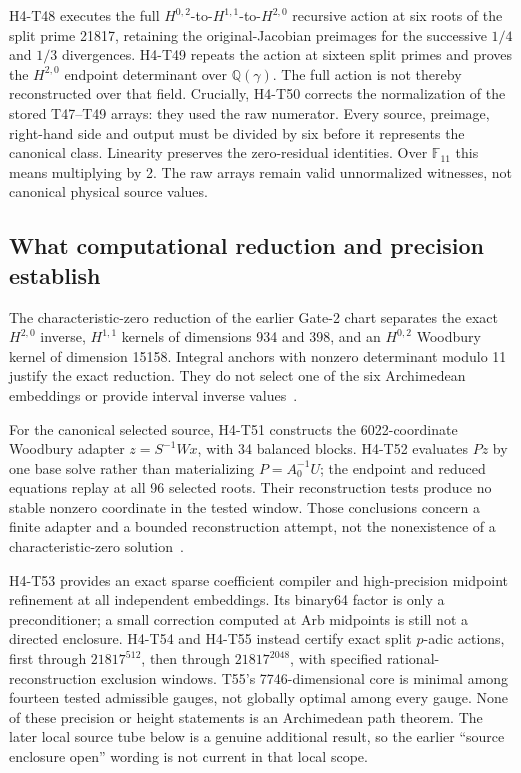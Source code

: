\documentclass[11pt]{article}
\theoremstyle{definition}
\theoremstyle{remark}
\begin{document}
H4-T48 executes the full \(H^{0,2}\)-to-\(H^{1,1}\)-to-\(H^{2,0}\)
recursive action at six roots of the split prime 21817, retaining the
original-Jacobian preimages for the successive \(1/4\) and \(1/3\)
divergences. H4-T49 repeats the action at sixteen split primes and proves
the \(H^{2,0}\) endpoint determinant over \(\mathbb Q(\gamma)\).
The full action is not thereby reconstructed over that field.
Crucially, H4-T50 corrects the normalization of the stored T47--T49 arrays:
they used the raw numerator. Every source, preimage, right-hand side and
output must be divided by six before it represents the canonical class.
Linearity preserves the zero-residual identities. Over \(\mathbb F_{11}\)
this means multiplying by 2. The raw arrays remain valid unnormalized
witnesses, not canonical physical source values.

\subsection{What computational reduction and precision establish}
\label{sec:root-numerics}

The characteristic-zero reduction of the earlier Gate-2 chart separates
the exact \(H^{2,0}\) inverse, \(H^{1,1}\) kernels of dimensions 934 and
398, and an \(H^{0,2}\) Woodbury kernel of dimension 15158. Integral
anchors with nonzero determinant modulo 11 justify the exact reduction.
They do not select one of the six Archimedean embeddings or provide
interval inverse values~\cite{FluxSource}.

For the canonical selected source, H4-T51 constructs the 6022-coordinate
Woodbury adapter \(z=S^{-1}Wx\), with 34 balanced blocks. H4-T52
evaluates \(Pz\) by one base solve rather than materializing
\(P=A_0^{-1}U\); the endpoint and reduced equations replay at all 96
selected roots. Their reconstruction tests produce no stable nonzero
coordinate in the tested window. Those conclusions concern a finite
adapter and a bounded reconstruction attempt, not the nonexistence of a
characteristic-zero solution~\cite{FluxRootNumerics}.

H4-T53 provides an exact sparse coefficient compiler and high-precision
midpoint refinement at all independent embeddings. Its binary64 factor
is only a preconditioner; a small correction computed at Arb midpoints is
still not a directed enclosure. H4-T54 and H4-T55 instead certify exact
split \(p\)-adic actions, first through \(21817^{512}\), then through
\(21817^{2048}\), with specified rational-reconstruction exclusion windows.
T55's 7746-dimensional core is minimal among fourteen tested admissible
gauges, not globally optimal among every gauge. None of these precision
or height statements is an Archimedean path theorem. The later local
source tube below is a genuine additional result, so the earlier
``source enclosure open'' wording is not current in that local scope.
\end{document}
